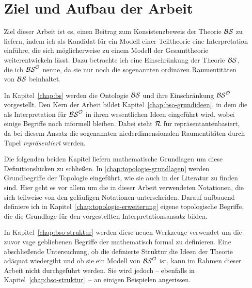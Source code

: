 \section{Ziel und Aufbau der Arbeit}
Ziel dieser Arbeit ist es, einen Beitrag zum Konsistenzbeweis der Theorie $\mathcal{BS}$ zu liefern, indem ich als Kandidat für ein Modell einer Teiltheorie eine Interpretation einführe, die sich möglicherweise zu einem Modell der Gesamttheorie weiterentwickeln lässt.
Dazu betrachte ich eine Einschränkung der Theorie $\mathcal{BS}$, die ich $\mathcal{BS}^{\mathcal{O}}$ nenne, da sie nur noch die sogenannten ordinären Raumentitäten von $\mathcal{BS}$ beinhaltet.

In
Kapitel~\ref{chap:bs} werden die Ontologie $\mathcal{BS}$ und ihre Einschränkung $\mathcal{BS}^{\mathcal{O}}$ vorgestellt.
Den Kern der Arbeit bildet Kapitel~\ref{chap:bso-grundideen}, in dem die \strukt als Interpretation für $\mathcal{BS}^{\mathcal{O}}$ in ihren wesentlichen Ideen eingeführt wird, wobei einige Begriffe noch informell bleiben.
Dabei steht $\mathcal{R}$ für \glqq repräsentantenbasiert\grqq, da bei diesem Ansatz die sogenannten niederdimensionalen Raumentitäten durch Tupel \textit{repräsentiert} werden.

Die
folgenden beiden Kapitel liefern mathematische Grundlagen um diese Definitionslücken zu schließen.
In \ref{chap:topologie-grundlagen} werden Grundbegriffe der Topologie eingeführt, wie sie auch in der Literatur zu finden sind. Hier geht es vor allem um die in dieser Arbeit verwendeten Notationen, die sich teilweise von den geläufigen Notationen unterscheiden.
Darauf aufbauend definiere ich in Kapitel~\ref{chap:topologie-erweiterung} eigene topologische Begriffe, die die Grundlage für den vorgestellten Interpretationsansatz bilden.

In
Kapitel~\ref{chap:bso-struktur} werden diese neuen Werkzeuge verwendet um die zuvor vage gebliebenen Begriffe der \strukt mathematisch formal zu definieren.
Eine abschließende Untersuchung, ob die definierte Struktur die Ideen der Theorie adäquat wiedergibt und ob sie ein Modell von $\mathcal{BS}^{\mathcal{O}}$ ist, kann im Rahmen dieser Arbeit nicht durchgeführt werden.
Sie wird jedoch -- ebenfalls in Kapitel~\ref{chap:bso-struktur}~-- an einigen Beispielen angerissen.


